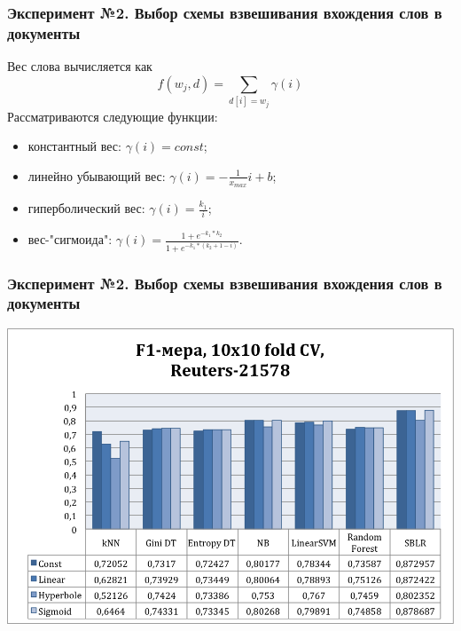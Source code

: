 \documentclass{beamer}
\begin{document}
\begin{frame}
\frametitle{Эксперимент №2. Выбор схемы взвешивания вхождения слов в документы}
Вес слова вычисляется как $$f(w_j,d)=\sum\limits_{d[i]=w_j}\gamma(i)$$
Рассматриваются следующие функции:
\begin{itemize}
	\item{константный вес: $\gamma(i)=const$;}
	\item{линейно убывающий вес: $\gamma(i)=-\frac{1}{x_{max}}i+b$;}
	\item{гиперболический вес: $\gamma(i)=\frac{k_1}{i}$;}
	\item{вес-"сигмоида": $\gamma(i)=\frac{1+e^{-k_1*k_2}}{1+e^{-k_1*(k_2+1-i)}}$.}
\end{itemize}
\end{frame}

\begin{frame}
\frametitle{Эксперимент №2. Выбор схемы взвешивания вхождения слов в документы}
\begin{center}
    \includegraphics[width=\linewidth,height=0.7\textheight,align=\center, trim=4 4 4 4, clip, keepaspectratio]{weighting.png}
\end{center}
\end{frame}
\end{document}
